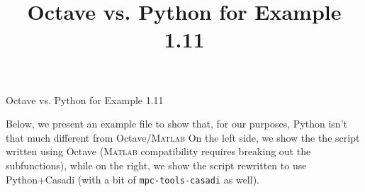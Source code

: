 \documentclass{article}
\title{Octave vs. Python for Example 1.11}
\begin{document}
\begin{center}
    \LARGE Octave vs. Python for Example 1.11
\end{center}

Below, we present an example file to show that, for our purposes, Python isn't that much different from Octave/\textsc{Matlab}
On the left side, we show the the script written using Octave (\textsc{Matlab} compatibility requires breaking out the subfunctions), while on the right, we show the script rewritten to use Python+Casadi (with a bit of \texttt{mpc-tools-casadi} as well).

\hspace{1em}


\end{document}
